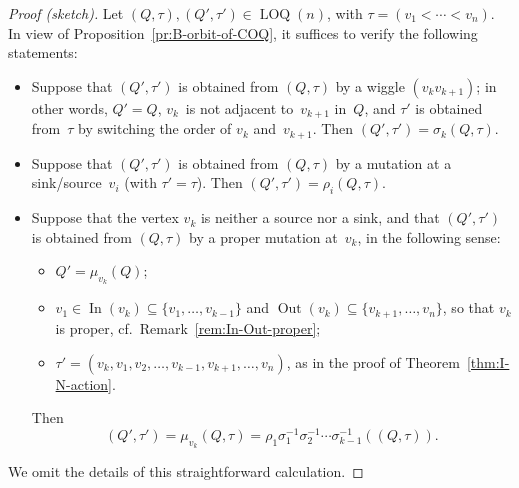 \documentclass[11pt, letterpaper]{amsart}
\theoremstyle{definition}
\numberwithin{equation}{section}
\def\In{{\operatorname{In}}}
\def\Out{{\operatorname{Out}}}
\newcommand\LOQ{\operatorname{LOQ}}
\begin{document}
\begin{proof}[Proof (sketch)]
Let $(Q,\tau),(Q',\tau')\in\LOQ(n)$, with $\tau=(v_1<\cdots<v_n)$. 
In view of Proposition~\ref{pr:B-orbit-of-COQ}, it suffices to verify the following statements: 
\begin{itemize}[leftmargin=.2in]
\item 
Suppose that $(Q',\tau')$ is obtained from $(Q,\tau)$ by a wiggle $(v_k v_{k+1})$; 
in other words, $Q'=Q$, $v_k$~is not adjacent to~$v_{k+1}$ in~$Q$,
and $\tau'$ is obtained from~$\tau$ by switching the order of $v_k$ and~$v_{k+1}$. 
Then $(Q',\tau')= \sigma_k(Q,\tau)$. 
\item
Suppose that $(Q',\tau')$ is obtained from $(Q,\tau)$ by a mutation at a sink/source~$v_i$
(with $\tau'=\tau$). 
Then $(Q',\tau') = \rho_i(Q,\tau)$.
\item
Suppose that the vertex $v_k$ is neither a source nor a sink, and that 
$(Q',\tau')$ is obtained from $(Q,\tau)$ by a proper mutation at~$v_k$, in the following sense: 
\begin{itemize}[leftmargin=.2in]
\item[$\scriptstyle\blacktriangleright$]
$Q'=\mu_{v_k}(Q)$; 
\item[$\scriptstyle\blacktriangleright$]
$v_1\in\In(v_k)\subseteq\{v_1,\dots,v_{k-1}\}$ and $\Out(v_k)\subseteq\{v_{k+1},\dots,v_n\}$, 
so that $v_k$ is proper, cf.\ Remark~\ref{rem:In-Out-proper};
\item[$\scriptstyle\blacktriangleright$]
$\tau'=(v_k, v_1, v_2, \dots, v_{k-1}, v_{k+1},  \dots, v_n)$, as in the proof of Theorem~\ref{thm:I-N-action}. 
\end{itemize}
Then
\begin{equation}
\label{eq:U'-proper-mut}
(Q',\tau') = \mu_{v_k}(Q,\tau)=\rho_1 \sigma_1^{-1} \sigma_2^{-1} \cdots \sigma_{k-1}^{-1}( (Q, \tau) ). 
\end{equation}
\end{itemize}
We omit the details of this straightforward calculation. 
\end{proof}
\end{document}
